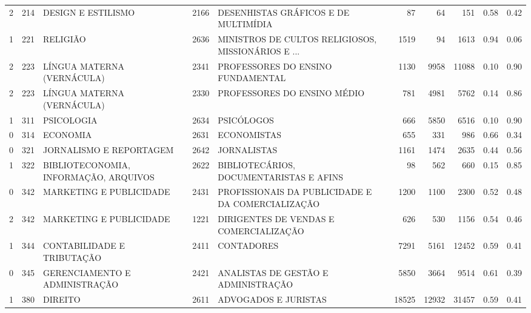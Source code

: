 \begin{table}
\begin{tabular}{rrlrlrrrrr}
       2 &    214 &                                 DESIGN E ESTILISMO & 2166 &               DESENHISTAS GRÁFICOS E DE MULTIMÍDIA &    87 &    64 &    151 & 0.58 & 0.42 \\
       1 &    221 &                                           RELIGIÃO & 2636 & MINISTROS DE CULTOS RELIGIOSOS, MISSIONÁRIOS E ... &  1519 &    94 &   1613 & 0.94 & 0.06 \\
       2 &    223 &                         LÍNGUA MATERNA (VERNÁCULA) & 2341 &                  PROFESSORES DO ENSINO FUNDAMENTAL &  1130 &  9958 &  11088 & 0.10 & 0.90 \\
       2 &    223 &                         LÍNGUA MATERNA (VERNÁCULA) & 2330 &                        PROFESSORES DO ENSINO MÉDIO &   781 &  4981 &   5762 & 0.14 & 0.86 \\
       1 &    311 &                                         PSICOLOGIA & 2634 &                                         PSICÓLOGOS &   666 &  5850 &   6516 & 0.10 & 0.90 \\
       0 &    314 &                                           ECONOMIA & 2631 &                                        ECONOMISTAS &   655 &   331 &    986 & 0.66 & 0.34 \\
       0 &    321 &                            JORNALISMO E REPORTAGEM & 2642 &                                        JORNALISTAS &  1161 &  1474 &   2635 & 0.44 & 0.56 \\
       1 &    322 &              BIBLIOTECONOMIA, INFORMAÇÃO, ARQUIVOS & 2622 &            BIBLIOTECÁRIOS, DOCUMENTARISTAS E AFINS &    98 &   562 &    660 & 0.15 & 0.85 \\
       0 &    342 &                            MARKETING E PUBLICIDADE & 2431 &  PROFISSIONAIS DA PUBLICIDADE E DA COMERCIALIZAÇÃO &  1200 &  1100 &   2300 & 0.52 & 0.48 \\
       2 &    342 &                            MARKETING E PUBLICIDADE & 1221 &           DIRIGENTES DE VENDAS E  COMERCIALIZAÇÃO  &   626 &   530 &   1156 & 0.54 & 0.46 \\
       1 &    344 &                         CONTABILIDADE E TRIBUTAÇÃO & 2411 &                                         CONTADORES &  7291 &  5161 &  12452 & 0.59 & 0.41 \\
       0 &    345 &                      GERENCIAMENTO E ADMINISTRAÇÃO & 2421 &                ANALISTAS DE GESTÃO E ADMINISTRAÇÃO &  5850 &  3664 &   9514 & 0.61 & 0.39 \\
       1 &    380 &                                            DIREITO & 2611 &                               ADVOGADOS E JURISTAS & 18525 & 12932 &  31457 & 0.59 & 0.41 \\

\end{tabular}
\end{table}
